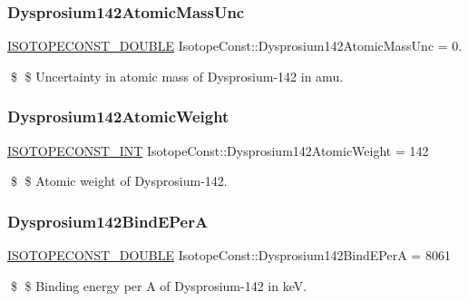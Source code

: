 \subsubsection{\texorpdfstring{Dysprosium142\+Atomic\+Mass\+Unc}{Dysprosium142AtomicMassUnc}}
{\footnotesize\ttfamily \mbox{\hyperlink{group___isotope_const-_macros_ga8f45a7272ce02c0b4c65c44636ed719a}{I\+S\+O\+T\+O\+P\+E\+C\+O\+N\+S\+T\+\_\+\+D\+O\+U\+B\+LE}} Isotope\+Const\+::\+Dysprosium142\+Atomic\+Mass\+Unc = 0.}

\$ \$ Uncertainty in atomic mass of Dysprosium-\/142 in amu. \mbox{\label{group___isotope_const-_dysprosium-_dy142_gabd4f817f3af9dd5185118dd95164c5a3}} 
\subsubsection{\texorpdfstring{Dysprosium142\+Atomic\+Weight}{Dysprosium142AtomicWeight}}
{\footnotesize\ttfamily \mbox{\hyperlink{group___isotope_const-_macros_ga5f18360b3e99483a35c32d789e62621c}{I\+S\+O\+T\+O\+P\+E\+C\+O\+N\+S\+T\+\_\+\+I\+NT}} Isotope\+Const\+::\+Dysprosium142\+Atomic\+Weight = 142}

\$ \$ Atomic weight of Dysprosium-\/142. \mbox{\label{group___isotope_const-_dysprosium-_dy142_ga7f0b39e1bc7f7d8500b61ec427c2a9cd}} 
\subsubsection{\texorpdfstring{Dysprosium142\+Bind\+E\+PerA}{Dysprosium142BindEPerA}}
{\footnotesize\ttfamily \mbox{\hyperlink{group___isotope_const-_macros_ga8f45a7272ce02c0b4c65c44636ed719a}{I\+S\+O\+T\+O\+P\+E\+C\+O\+N\+S\+T\+\_\+\+D\+O\+U\+B\+LE}} Isotope\+Const\+::\+Dysprosium142\+Bind\+E\+PerA = 8061}

\$ \$ Binding energy per A of Dysprosium-\/142 in keV. \mbox{\label{group___isotope_const-_dysprosium-_dy142_ga729e250d2463146aabf06a8cfa726ab4}} 
